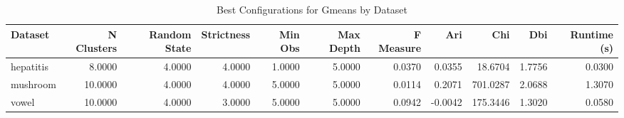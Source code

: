 \begin{table*}[ht!]
\caption{Best Configurations for Gmeans by Dataset}
\label{tab:best_configs_gmeans}
\begin{tabular}{lrrrrrrrrrr}
Dataset & N Clusters & Random State & Strictness & Min Obs & Max Depth & F Measure & Ari & Chi & Dbi & Runtime (s) \\\midrule

hepatitis & 8.0000 & 4.0000 & 4.0000 & 1.0000 & 5.0000 & 0.0370 & 0.0355 & 18.6704 & 1.7756 & 0.0300 \\
mushroom & 10.0000 & 4.0000 & 4.0000 & 5.0000 & 5.0000 & 0.0114 & 0.2071 & 701.0287 & 2.0688 & 1.3070 \\
vowel & 10.0000 & 4.0000 & 3.0000 & 5.0000 & 5.0000 & 0.0942 & -0.0042 & 175.3446 & 1.3020 & 0.0580 \\
\end{tabular}
\end{table*}
